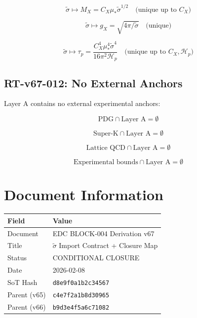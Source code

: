 \documentclass[11pt,letterpaper]{article}
\newcommand{\st}{\tilde{\sigma}}
\newcommand{\Hp}{\mathcal{H}_p}
\begin{document}
\begin{equation}
\st \mapsto M_X = C_X \mu_* \st^{1/2} \quad \text{(unique up to } C_X \text{)}
\label{eq:map-mx}
\end{equation}

\begin{equation}
\st \mapsto g_X = \sqrt{4\pi/\st} \quad \text{(unique)}
\label{eq:map-gx}
\end{equation}

\begin{equation}
\st \mapsto \tau_p = \frac{C_X^4 \mu_*^4 \st^4}{16\pi^2 \Hp} \quad \text{(unique up to } C_X, \Hp \text{)}
\label{eq:map-taup}
\end{equation}

\subsection{RT-v67-012: No External Anchors}
\label{app:rt012}

Layer A contains no external experimental anchors:

\begin{equation}
\text{PDG} \cap \text{Layer A} = \emptyset
\label{eq:no-pdg}
\end{equation}

\begin{equation}
\text{Super-K} \cap \text{Layer A} = \emptyset
\label{eq:no-superk}
\end{equation}

\begin{equation}
\text{Lattice QCD} \cap \text{Layer A} = \emptyset
\label{eq:no-lattice}
\end{equation}

\begin{equation}
\text{Experimental bounds} \cap \text{Layer A} = \emptyset
\label{eq:no-exp}
\end{equation}

\section*{Document Information}

\begin{center}
\begin{tabular}{ll}
\toprule
Field & Value \\
\midrule
Document & EDC BLOCK-004 Derivation v67 \\
Title & $\st$ Import Contract + Closure Map \\
Status & CONDITIONAL CLOSURE \\
Date & 2026-02-08 \\
SoT Hash & \texttt{d8e9f0a1b2c34567} \\
Parent (v65) & \texttt{c4e7f2a1b8d30965} \\
Parent (v66) & \texttt{b9d3e4f5a6c71082} \\
\bottomrule
\end{tabular}
\end{center}
\end{document}
